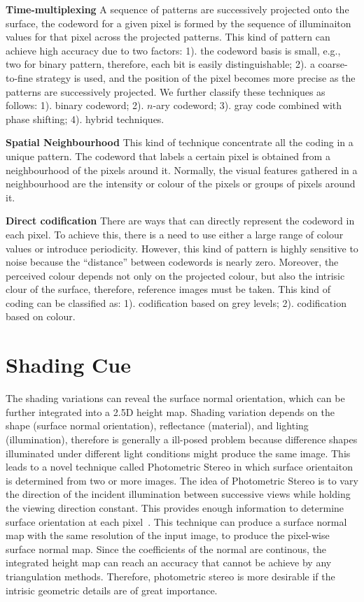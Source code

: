 \textbf{Time-multiplexing} A sequence of patterns are successively projected onto the surface, the codeword for a given pixel is formed by the sequence of illuminaiton values for that pixel across the projected patterns. This kind of pattern can achieve high accuracy due to two factors: 1). the codeword basis is small, e.g., two for binary pattern, therefore, each bit is easily distinguishable; 2). a coarse-to-fine strategy is used, and the position of the pixel becomes more precise as the patterns are successively projected. We further classify these techniques as follows: 1). binary codeword; 2). $n$-ary codeword; 3). gray code combined with phase shifting; 4). hybrid techniques.

\textbf{Spatial Neighbourhood} This kind of technique concentrate all the coding in a unique pattern. The codeword that labels a certain pixel is obtained from a neighbourhood of the pixels around it. Normally, the visual features gathered in a neighbourhood are the intensity or colour of the pixels or groups of pixels around it.

\textbf{Direct codification} There are ways that can directly represent the codeword in each pixel. To achieve this, there is a need to use either a large range of colour values or introduce periodicity. However, this kind of pattern is highly sensitive to noise because the ``distance'' between codewords is nearly zero. Moreover, the perceived colour depends not only on the projected colour, but also the intrisic clour of the surface, therefore, reference images must be taken. This kind of coding can be classified as: 1). codification based on grey levels; 2). codification based on colour.

\section{Shading Cue}
The shading variations can reveal the surface normal orientation, which can be further integrated into a 2.5D height map. Shading variation depends on the shape (surface normal orientation), reflectance (material), and lighting (illumination), therefore is generally a ill-posed problem because difference shapes illuminated under different light conditions might produce the same image. This leads to a novel technique called Photometric Stereo in which surface orientaiton is determined from two or more images. The idea of Photometric Stereo is to vary the direction of the incident illumination between successive views while holding the viewing direction constant. This provides enough information to determine surface orientation at each pixel~\cite{woodham1979photometric}. This technique can produce a surface normal map with the same resolution of the input image, \ie to produce the pixel-wise surface normal map. Since the coefficients of the normal are continous, the integrated height map can reach an accuracy that cannot be achieve by any triangulation methods. Therefore, photometric stereo is more desirable if the intrisic geometric details are of great importance.

